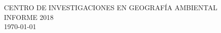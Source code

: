 \documentclass[12pt]{report}
\begin{document}
\begin{center}
 CENTRO DE INVESTIGACIONES EN GEOGRAFÍA AMBIENTAL \\
 INFORME 2018 \\
\today \\
\end{center}

\renewcommand{\labelenumi}{%
 \textbf{\theenumi}. }

\renewcommand{\theenumii}{\arabic{enumii}}
\renewcommand{\labelenumii}{%
    \textbf{\theenumi}.\theenumii. }

\renewcommand{\theenumiii}{\arabic{enumiii}}
\renewcommand{\labelenumiii}{%
    \textbf{\theenumi}.\theenumii.\theenumiii.}

\renewcommand{\labelitemi}{\tiny$\blacksquare$}
\renewcommand{\labelitemii}{\tiny$\blacksquare$}
\renewcommand{\labelitemiii}{\tiny$\blacksquare$}
\end{document}
